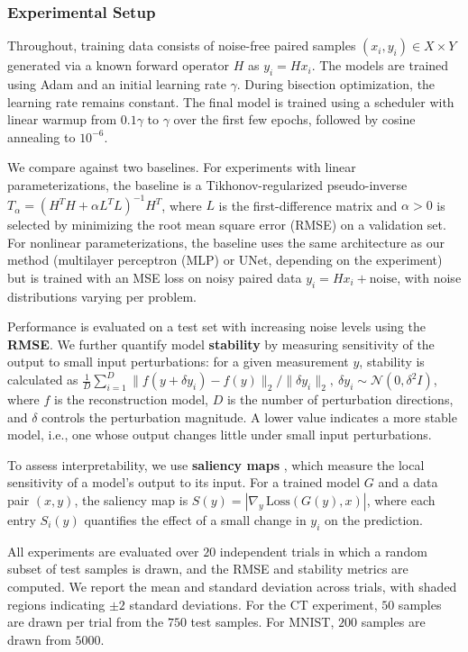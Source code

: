 \documentclass{article}
\theoremstyle{definition}
\theoremstyle{remarksty}
\begin{document}
\subsubsection{Experimental Setup}
Throughout, training data consists of noise-free paired samples $(x_i, y_i)\in X\times Y$ generated via a known forward operator $H$ as $y_i = Hx_i$. The models are trained using Adam and an initial learning rate $\gamma$. During bisection optimization, the learning rate remains constant. The final model is trained using a scheduler with linear warmup from $0.1\gamma$ to $\gamma$ over the first few epochs, followed by cosine annealing to $10^{-6}$. 

We compare against two baselines. For experiments with linear parameterizations, the baseline is a Tikhonov-regularized pseudo-inverse $T_\alpha = (H^TH + \alpha L^TL)^{-1}H^T$, where $L$ is the first-difference matrix and $\alpha > 0$ is selected by minimizing the root mean square error (RMSE) on a validation set. For nonlinear parameterizations, the baseline uses the same architecture as our method (multilayer perceptron (MLP) or UNet, depending on the experiment) but is trained with an MSE loss on noisy paired data $y_i = Hx_i + \text{noise}$, with noise distributions varying per problem.

Performance is evaluated on a test set with increasing noise levels using the \textbf{RMSE}. We further quantify model \textbf{stability} by measuring sensitivity of the output to small input perturbations: for a given measurement $y$, stability is calculated as $\frac{1}{D}\sum_{i=1}^D \|f(y + \delta y_i) - f(y)\|_2 /\|\delta y_i\|_2,\ \delta y_i \sim \mathcal{N}(0, \delta^2 I)$, where $f$ is the reconstruction model, $D$ is the number of perturbation directions, and $\delta$ controls the perturbation magnitude. A lower value indicates a more stable model, i.e., one whose output changes little under small input perturbations.

To assess interpretability, we use \textbf{saliency maps} \cite{simonyan_deep_2013}, which measure the local sensitivity of a model's output to its input. For a trained model $G$ and a data pair $(x, y)$, the saliency map is $S(y) = |\nabla_y\, \mathrm{Loss}(G(y), x)|$, where each entry $S_i(y)$ quantifies the effect of a small change in $y_i$ on the prediction.  

All experiments are evaluated over $20$ independent trials in which a random subset of test samples is drawn, and the RMSE and stability metrics are computed. We report the mean and standard deviation across trials, with shaded regions indicating $\pm 2$ standard deviations. For the CT experiment, $50$ samples are drawn per trial from the $750$ test samples. For MNIST, $200$ samples are drawn from $5000$.
\end{document}
